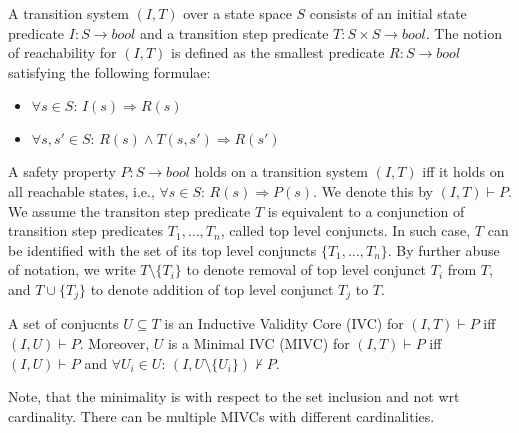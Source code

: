 A transition system $(I,T)$ over a state space $S$ consists of an initial state predicate $I : S \rightarrow bool$ and a transition step predicate $T : S \times S \rightarrow bool$. The notion of reachability for $(I, T)$ is defined as the smallest predicate $R : S \rightarrow bool$ satisfying the following formulae:

\begin{itemize}
	\item[] $\forall s \in S: \, I(s) \Rightarrow R(s)$
	\item[] $\forall s, s' \in S: \, R(s) \wedge T(s, s') \Rightarrow R(s')$
\end{itemize}

A safety property $P: S \rightarrow bool$ holds on a transition system $(I, T)$ iff it holds on all reachable states, i.e., $\forall s \in S: \, R(s) \Rightarrow P(s)$. We denote this by $(I, T) \vdash P$. We assume
the transiton step predicate $T$ is equivalent to   a conjunction of transition step predicates $T_1, \ldots, T_n$,  called top level conjuncts. 
In such case, $T$ can be identified with the set of its top level conjuncts $\{ T_1, \ldots, T_n\}$. By further abuse of notation, we write $T \setminus \{ T_i \}$ to denote removal of top level conjunct $T_i$ from $T$, and $T \cup \{ T_j\}$ to denote addition of top level conjunct $T_j$ to $T$. 


\begin{definition}
A set of conjucnts $U \subseteq T$ is an Inductive Validity Core (IVC) for $(I, T) \vdash P$ iff $(I, U) \vdash P$. Moreover, $U$ is a Minimal IVC (MIVC) for $(I, T) \vdash P$ iff $(I, U) \vdash P$ and $\forall U_i \in U: \, (I, U \setminus \{ U_i\}) \nvdash P$.
\end{definition}

Note, that the minimality is with respect to the set inclusion and not wrt cardinality. There can be multiple MIVCs with different cardinalities. 







